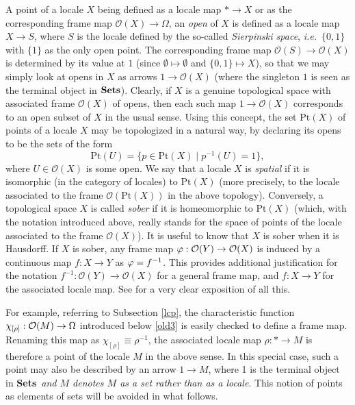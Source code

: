 \documentclass[11pt]{article}
\newcommand{\beq}{\begin{equation}}
\newcommand{\eeq}{\end{equation}}
\newcommand{\Sets}{\mbox{\textbf{Sets}}}
\newcommand{\raw}{\rightarrow} \newcommand{\rat}{\mapsto}
\newcommand{\inv}{^{-1}}
\newcommand{\er}{\eqref}
\newcommand{\rh}{\rho} \newcommand{\sg}{\sigma}
\newcommand{\ch}{\chi} \newcommand{\ps}{\psi} \newcommand{\Ps}{\Psi}
\newcommand{\CO}{{\mathcal O}} \newcommand{\CP}{{\mathcal P}}
\newcommand{\ie}{\textit{i.e.}}
\begin{document}
A point of a locale $X$ being defined as a locale map $*\raw X$ or as the corresponding
frame map $\CO(X)\raw\Omega$, an {\it open} of $X$ is defined as a  locale map $X\raw S$, where $S$ is the locale defined by the so-called {\it Sierpinski space}, \ie\ $\{0,1\}$ with $\{1\}$ as the only open point.
The corresponding frame map $\CO(S)\raw \CO(X)$ is determined by its  value at $1$ (since $\emptyset\mapsto\emptyset$ and $\{0,1\}\mapsto X$), so that we may simply look at opens in $X$ as arrows
 $1\raw \CO(X)$ (where the singleton $1$ is seen as the terminal object in $\Sets$).   Clearly, if $X$ is a genuine topological space with associated frame $\CO(X)$ of opens, then
each such map $1\raw \CO(X)$ corresponds to an open subset of $X$ in the usual
sense. Using this concept, the set $\mathrm{Pt}(X)$ of points of a locale $X$
may be topologized in a natural way, by declaring its opens to be
the sets of the form
\beq
\mathrm{Pt}(U)=\{p\in \mathrm{Pt}(X)\mid p\inv(U)=1\}, \label{openpt}\eeq
 where  $U\in \CO(X)$ is some open.  We say that a locale $X$ is {\it spatial}
if it is isomorphic (in the category of locales) to
$\mathrm{Pt}(X)$ (more precisely, to the locale associated to the frame
$\CO(\mathrm{Pt}(X))$ in the above topology). Conversely, a topological space
$X$ is called {\it sober} if it is homeomorphic to $\mathrm{Pt}(X)$
 (which, with the notation introduced above, really stands for the space of
points of the locale associated to the frame $\CO(X)$). It is useful to know
that $X$ is sober when it is Hausdorff. If $X$ is sober, any frame map
$\phv:\CO(Y)\raw \CO(X)$ is induced by a continuous map $f:X\raw Y$ as
$\phv=f\inv$. This provides additional justification for the notation $f\inv:
\CO(Y)\raw \CO(X)$ for a general frame map, and
$f:X\raw Y$ for the associated locale map. See \cite[\S IX.3]{maclanemoerdijk92}
for a very clear exposition of all this.

For example, referring to Subsection \ref{lcp}, the characteristic function
$\ch_{[\rho]}:\CO(M)\raw\Om$ introduced below \er{old3} is easily checked to
define a frame map. Renaming this map
as $\ch_{[\rho]}\equiv\rh\inv$, the associated locale map $\rh: *\raw M$ is
therefore a point of the locale $M$ in the above sense. In this special case,
such a point may also be described by an arrow $1\raw M$, where 1 is the
terminal object in \Sets\ {\it and $M$ denotes $M$ as a set rather than as a
locale}. This notion of points as elements of sets will be avoided in what
follows.
\end{document}
